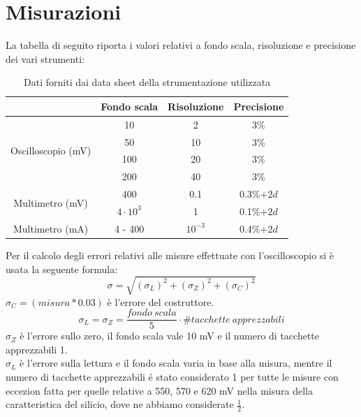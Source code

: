 \documentclass[]{article}
\begin{document}
\section{Misurazioni}
La tabella di seguito riporta i valori relativi a fondo scala, risoluzione e precisione dei vari strumenti:
\begin{center}
	\begin{table}[H]
		\begin{tabular}{|c|c|c|c|}
			\cline{2-4}
			\multicolumn{1}{c|}{} & Fondo scala & Risoluzione & Precisione \\
			\hline
			\multirow{4}{*}{Oscilloscopio (mV)} & 10 & 2 & 3\% \\
			\cline{2-4}
			& 50 & 10 & 3\% \\
			\cline{2-4}
			& 100 & 20 & 3\% \\
			\cline{2-4}
			& 200 & 40 & 3\% \\
			\hline
			\multirow{2}{*}{Multimetro (mV)} & 400 & 0.1 & 0.3\%$+2d$ \\
			\cline{2-4}
			&$4\cdot10^3$ & 1 & 0.1\%$+2d$\\
			\hline
			Multimetro (mA) & 4 - 400 & $10^{-3}$ & 0.4\%$+2d$ \\
			\hline
		\end{tabular}
	\label{tab:strumenti}
	\caption{Dati forniti dai data sheet della strumentazione utilizzata}
	\end{table}

\end{center}
Per il calcolo degli errori relativi alle misure effettuate con l'oscilloscopio si è usata la seguente formula:
\begin{equation}
	\sigma=\sqrt{(\sigma_{L})^{2}+(\sigma_{Z})^{2}+(\sigma_{C})^{2}}
\end{equation}
$ 	\sigma_{C}= (misura*0.03) $ è l'errore del costruttore.
\begin{equation*}
	\sigma_{L}=\sigma_{Z}=\frac{fondo \:scala}{5}\cdot\#tacchette \:apprezzabili
\end{equation*}
$ \sigma_{Z} $ è l'errore sullo zero, il fondo scala vale 10 mV e il numero di tacchette apprezzabili 1.\\
$ \sigma_{L} $ è l'errore sulla lettura e il fondo scala varia in base alla misura, mentre il numero di tacchette apprezzabili é stato considerato 1 per tutte le misure con eccezion fatta per quelle relative a 550, 570 e 620 mV nella misura della caratteristica del silicio, dove ne abbiamo considerate $\frac{1}{2}$.
\end{document}
